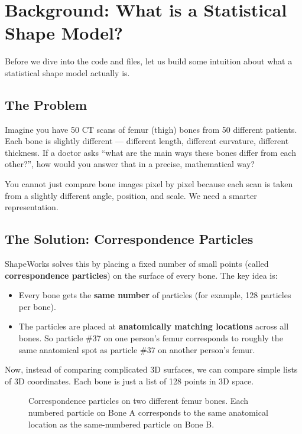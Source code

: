 \documentclass[12pt,a4paper]{article}
\begin{document}
\section{Background: What is a Statistical Shape Model?}

Before we dive into the code and files, let us build some intuition about what a statistical shape model actually is.

\subsection{The Problem}

Imagine you have 50 CT scans of femur (thigh) bones from 50 different patients. Each bone is slightly different --- different length, different curvature, different thickness. If a doctor asks ``what are the main ways these bones differ from each other?'', how would you answer that in a precise, mathematical way?

You cannot just compare bone images pixel by pixel because each scan is taken from a slightly different angle, position, and scale. We need a smarter representation.

\subsection{The Solution: Correspondence Particles}

ShapeWorks solves this by placing a fixed number of small points (called \textbf{correspondence particles}) on the surface of every bone. The key idea is:

\begin{itemize}
    \item Every bone gets the \textbf{same number} of particles (for example, 128 particles per bone).
    \item The particles are placed at \textbf{anatomically matching locations} across all bones. So particle \#37 on one person's femur corresponds to roughly the same anatomical spot as particle \#37 on another person's femur.
\end{itemize}

Now, instead of comparing complicated 3D surfaces, we can compare simple lists of 3D coordinates. Each bone is just a list of 128 points in 3D space.

\begin{figure}[H]
    \centering
    \caption{Correspondence particles on two different femur bones. Each numbered particle on Bone A corresponds to the same anatomical location as the same-numbered particle on Bone B.}
    \label{fig:correspondence}
\end{figure}
\end{document}
